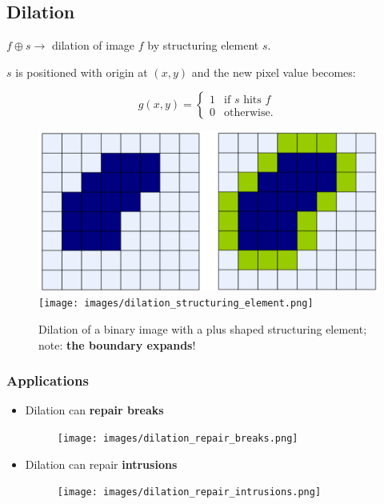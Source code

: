 \subsection*{Dilation}

$f \oplus s \rightarrow$ dilation of image $f$ by structuring element $s$.

$s$ is positioned with origin at $(x, y)$ and the new pixel value becomes:

\begin{equation*}
  g(x, y) =
  \begin{cases}
    1 & \text{if } s \text{ hits } f\\
    0 & \text{otherwise}.
  \end{cases}
\end{equation*}

\begin{figure}[H]
  \centering
  \includegraphics[width=\linewidth]{images/dilation.png}
  \texttt{[image: images/dilation\_structuring\_element.png]}
  \caption{Dilation of a binary image with a plus shaped structuring element; note: \textbf{the boundary expands}!}
\end{figure}

\subsubsection*{Applications}

\begin{itemize}
  \item Dilation can \textbf{repair breaks}

    \begin{minipage}{\linewidth}
      \begin{figure}[H]
        \centering
        \texttt{[image: images/dilation\_repair\_breaks.png]}
      \end{figure}
    \end{minipage}

  \item Dilation can repair \textbf{intrusions}

    \begin{minipage}{\linewidth}
      \begin{figure}[H]
        \centering
        \texttt{[image: images/dilation\_repair\_intrusions.png]}
      \end{figure}
    \end{minipage}
\end{itemize}
  

